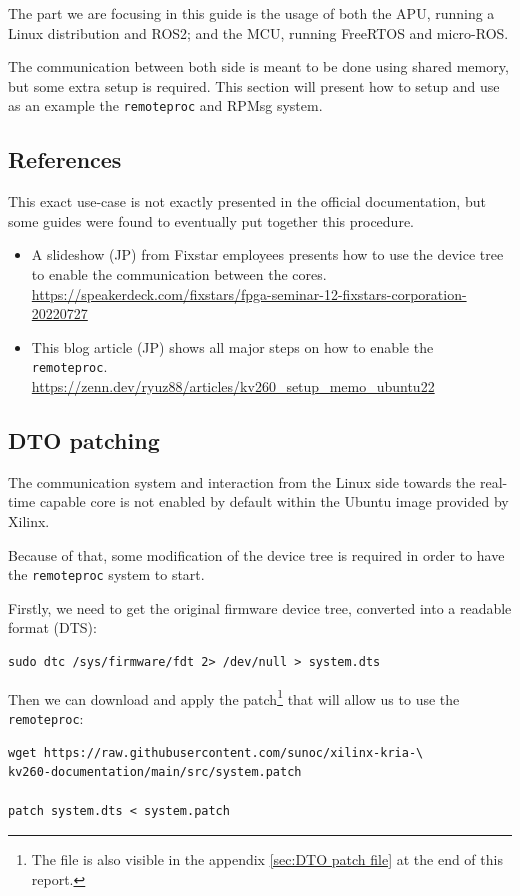 \documentclass[10pt]{article}
\begin{document}
The part we are focusing in this guide is the usage of both the APU, running
a Linux distribution and ROS2; and the MCU, running FreeRTOS and micro-ROS.

The communication between both side is meant to be done using shared memory, but
some extra setup is required.
This section will present how to setup and use as an example the \verb|remoteproc|
and RPMsg system.

\subsection{References}
\label{sec:referances}
This exact use-case is not exactly presented in the official documentation, but some
guides were found to eventually put together this procedure.

\begin{itemize}
\item A slideshow (JP) from Fixstar employees presents how to use the device tree to enable the communication between the cores. \\
  \url{https://speakerdeck.com/fixstars/fpga-seminar-12-fixstars-corporation-20220727}
\item This blog article (JP) shows all major steps on how to enable the \verb|remoteproc|. \\
  \url{https://zenn.dev/ryuz88/articles/kv260_setup_memo_ubuntu22}
\end{itemize}


\subsection{DTO patching}
\label{sec:dto-patching}
The communication system and interaction from the Linux side towards the real-time capable core
is not enabled by default within the Ubuntu image provided by Xilinx.

Because of that, some modification of the device tree is required in order to have
the \verb|remoteproc| system to start.

Firstly, we need to get the original firmware device tree, converted
into a readable format (DTS):
\begin{tcolorbox}
\begin{verbatim}
sudo dtc /sys/firmware/fdt 2> /dev/null > system.dts
\end{verbatim}
\end{tcolorbox}

Then we can download and apply the patch\footnote{The file is also visible in the appendix \ref{sec:DTO patch file} at the end of this report.} that will allow us to use the \verb|remoteproc|:
\begin{tcolorbox}
\begin{verbatim}
wget https://raw.githubusercontent.com/sunoc/xilinx-kria-\
kv260-documentation/main/src/system.patch

patch system.dts < system.patch
\end{verbatim}
\end{tcolorbox}
\end{document}
